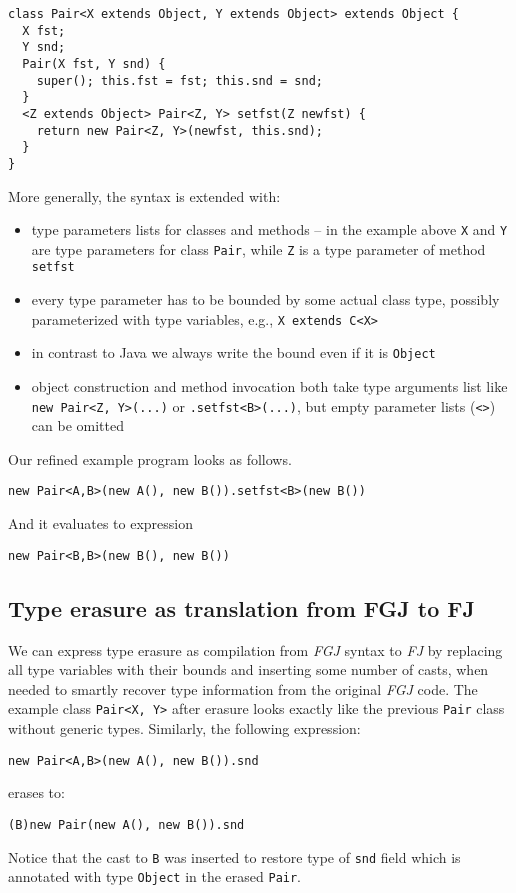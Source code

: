 \documentclass{article}[12pt]
\begin{document}
\begin{verbatim}
class Pair<X extends Object, Y extends Object> extends Object {
  X fst;
  Y snd;
  Pair(X fst, Y snd) {
    super(); this.fst = fst; this.snd = snd;
  }
  <Z extends Object> Pair<Z, Y> setfst(Z newfst) {
    return new Pair<Z, Y>(newfst, this.snd);
  }
}
\end{verbatim}
More generally, the syntax is extended with:

\begin{itemize}
\item type parameters lists for classes and methods -- in the example
  above \texttt{X} and \texttt{Y} are type parameters for class
  \texttt{Pair}, while \texttt{Z} is a type parameter of method
  \texttt{setfst}
\item every type parameter has to be bounded by some actual class
  type, possibly parameterized with type variables, e.g.,
  \texttt{X extends C<X>}
\item in contrast to Java we always write the bound even if it
  is \texttt{Object}
\item object construction and method invocation both take
  type arguments list like \texttt{new Pair<Z, Y>(...)} or
  \texttt{.setfst<B>(...)}, but empty parameter lists (\texttt{<>})
  can be omitted
\end{itemize}
Our refined example program looks as follows.

\begin{verbatim}
new Pair<A,B>(new A(), new B()).setfst<B>(new B())
\end{verbatim}
And it evaluates to expression
\begin{verbatim}
new Pair<B,B>(new B(), new B())
\end{verbatim}

\subsection{Type erasure as translation from FGJ to FJ}

We can express type erasure as compilation from \emph{FGJ} syntax
to \emph{FJ} by replacing all type variables with their bounds
and inserting some number of casts, when needed to smartly recover
type information from the original \emph{FGJ} code. The example class
\texttt{Pair<X, Y>} after erasure looks exactly like the previous
\texttt{Pair} class without generic types. Similarly, the following
expression:
\begin{verbatim}
new Pair<A,B>(new A(), new B()).snd
\end{verbatim}
erases to:
\begin{verbatim}
(B)new Pair(new A(), new B()).snd
\end{verbatim}
Notice that the cast to \texttt{B} was inserted to restore type
of \texttt{snd} field which is annotated with type \texttt{Object}
in the erased \texttt{Pair}.
\end{document}
